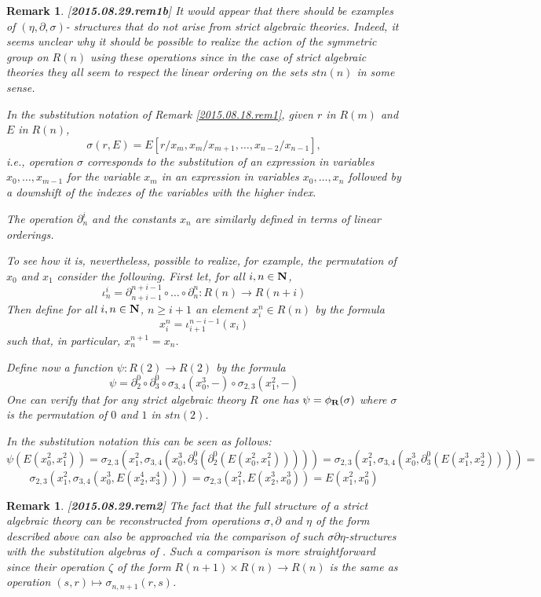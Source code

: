 \documentclass[11pt]{article}
\newtheorem{remark}[proposition]{Remark}
\newcommand{\llabel}[1]{\label{#1}[{\bf #1}]}
\newcommand{\sr}{\rightarrow}
\newcommand{\nn}{{\bf N\rm}}
\newcommand{\nat}{\nn}
\newcommand{\rr}{{\bf R}}
\begin{document}
%
\begin{remark}\rm
\llabel{2015.08.29.rem1b}
It would appear that there should be examples of $(\eta,\partial,\sigma)$- structures that do not arise from strict algebraic theories. Indeed, it seems unclear why it should be possible to realize the action of the symmetric group on $R(n)$ using these operations since  in the case of strict algebraic theories  they all seem to respect the linear ordering on the sets $stn(n)$ in some sense. 

In the substitution notation of Remark \ref{2015.08.18.rem1}, given $r$ in $R(m)$ and $E$ in $R(n)$, 
%
$$\sigma(r,E)=E[r/x_m,x_m/x_{m+1},\dots,x_{n-2}/x_{n-1}],$$
%
i.e., operation $\sigma$ corresponds to the substitution of an expression in variables $x_0,\dots,x_{m-1}$ for the variable $x_m$ in an expression in variables $x_0,\dots,x_n$ followed by a downshift of the indexes of the variables with the higher index. 

The operation $\partial_n^i$ and the constants $x_{n}$ are similarly defined in terms of linear orderings.

To see how it is, nevertheless, possible to realize, for example, the permutation of $x_0$ and $x_1$ consider the following. First let, for all $i,n\in\nat$, 
%
$$\iota_n^i=\partial_{n+i-1}^{n+i-1}\circ \dots\circ \partial_n^n:R(n)\sr R(n+i)$$
%
Then define for all $i,n\in\nat$, $n\ge i+1$ an element $x^n_i\in R(n)$ by the formula
%
$$x^n_i=\iota_{i+1}^{n-i-1}(x_i)$$
%
such that, in particular, $x^{n+1}_{n}=x_n$.

Define now a function $\psi:R(2)\sr R(2)$ by the formula
%
$$\psi=\partial^0_2\circ \partial^0_3\circ \sigma_{3,4}(x_0^3,-)\circ \sigma_{2,3}(x_1^2,-)$$
%
One can verify that for any strict algebraic theory $R$ one has $\psi=\phi_{\rr}(\sigma)$ where $\sigma$ is the permutation of $0$ and $1$ in $stn(2)$.

In the substitution notation this can be seen as follows:
%
$$\psi(E(x^2_0,x_1^2))=\sigma_{2,3}(x_1^2,\sigma_{3,4}(x_0^3,\partial^0_3(\partial^0_2(E(x^2_0,x_1^2)))))=\sigma_{2,3}(x_1^2,\sigma_{3,4}(x_0^3,\partial^0_3(E(x^3_1,x^3_2))))=$$
$$\sigma_{2,3}(x_1^2,\sigma_{3,4}(x_0^3,E(x^4_2,x^4_3)))=\sigma_{2,3}(x_1^2,E(x^3_2,x^3_0))=E(x^2_1,x^2_0)$$
%
\end{remark}
%
\begin{remark}\rm
\llabel{2015.08.29.rem2}
The fact that the full structure of a strict algebraic theory can be reconstructed from operations $\sigma,\partial$ and $\eta$ of the form described above can also be approached via the comparison of such $\sigma\partial\eta$-structures with the substitution algebras of \cite[Definition 3.1]{FPT}. Such a comparison is more straightforward since their operation $\zeta$ of the form $R(n+1)\times R(n)\sr R(n)$ is the same as operation $(s,r)\mapsto \sigma_{n,n+1}(r,s)$.
\end{remark}
\end{document}
